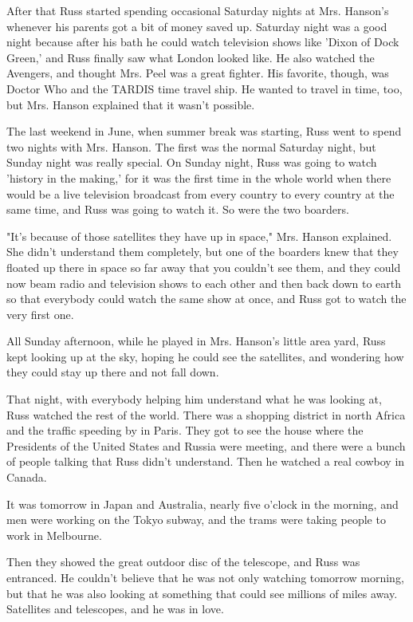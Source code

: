 \documentclass[a4paper,11pt]{article}
\begin{document}
After that Russ started spending occasional Saturday nights at Mrs. Hanson's whenever his parents got a bit of money saved up. Saturday night was a good night because after his bath he could watch television shows like 'Dixon of Dock Green,' and Russ finally saw what London looked like. He also watched the Avengers, and thought Mrs. Peel was a great fighter. His favorite, though, was Doctor Who and the TARDIS time travel ship. He wanted to travel in time, too, but Mrs. Hanson explained that it wasn't possible.

The last weekend in June, when summer break was starting, Russ went to spend two nights with Mrs. Hanson. The first was the normal Saturday night, but Sunday night was really special. On Sunday night, Russ was going to watch 'history in the making,' for it was the first time in the whole world when there would be a live television broadcast from every country to every country at the same time, and Russ was going to watch it. So were the two boarders.

"It's because of those satellites they have up in space," Mrs. Hanson explained. She didn't understand them completely, but one of the boarders knew that they floated up there in space so far away that you couldn't see them, and they could now beam radio and television shows to each other and then back down to earth so that everybody could watch the same show at once, and Russ got to watch the very first one.

All Sunday afternoon, while he played in Mrs. Hanson's little area yard, Russ kept looking up at the sky, hoping he could see the satellites, and wondering how they could stay up there and not fall down.

That night, with everybody helping him understand what he was looking at, Russ watched the rest of the world. There was a shopping district in north Africa and the traffic speeding by in Paris. They got to see the house where the Presidents of the United States and Russia were meeting, and there were a bunch of people talking that Russ didn't understand. Then he watched a real cowboy in Canada.

It was tomorrow in Japan and Australia, nearly five o'clock in the morning, and men were working on the Tokyo subway, and the trams were taking people to work in Melbourne.

Then they showed the great outdoor disc of the telescope, and Russ was entranced. He couldn't believe that he was not only watching tomorrow morning, but that he was also looking at something that could see millions of miles away. Satellites and telescopes, and he was in love.
\end{document}

